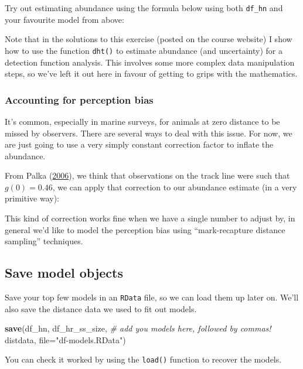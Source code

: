 \documentclass[]{book}
\newenvironment{Shaded}{\begin{snugshade}}{\end{snugshade}}
\newcommand{\KeywordTok}[1]{\textcolor[rgb]{0.13,0.29,0.53}{\textbf{#1}}}
\newcommand{\DataTypeTok}[1]{\textcolor[rgb]{0.13,0.29,0.53}{#1}}
\newcommand{\StringTok}[1]{\textcolor[rgb]{0.31,0.60,0.02}{#1}}
\newcommand{\CommentTok}[1]{\textcolor[rgb]{0.56,0.35,0.01}{\textit{#1}}}
\newcommand{\NormalTok}[1]{#1}
\theoremstyle{definition}
\theoremstyle{definition}
\theoremstyle{remark}
\begin{document}
Try out estimating abundance using the formula below using both
\texttt{df\_hn} and your favourite model from above:

Note that in the solutions to this exercise (posted on the course
website) I show how to use the function \texttt{dht()} to estimate
abundance (and uncertainty) for a detection function analysis. This
involves some more complex data manipulation steps, so we've left it out
here in favour of getting to grips with the mathematics.

\subsubsection{Accounting for perception
bias}\label{accounting-for-perception-bias}

It's common, especially in marine surveys, for animals at zero distance
to be missed by observers. There are several ways to deal with this
issue. For now, we are just going to use a very simply constant
correction factor to inflate the abundance.

From Palka (\protect\hyperlink{ref-Palka2006}{2006}), we think that
observations on the track line were such that \(g(0)=0.46\), we can
apply that correction to our abundance estimate (in a very primitive
way):

This kind of correction works fine when we have a single number to
adjust by, in general we'd like to model the perception bias using
``mark-recapture distance sampling'' techniques.

\subsection{Save model objects}\label{save-model-objects}

Save your top few models in an \texttt{RData} file, so we can load them
up later on. We'll also save the distance data we used to fit out
models.

\begin{Shaded}
\begin{Highlighting}[]
\KeywordTok{save}\NormalTok{(df_hn, df_hr_ss_size, }\CommentTok{# add you models here, followed by commas!}
\NormalTok{     distdata,}
     \DataTypeTok{file=}\StringTok{"df-models.RData"}\NormalTok{)}
\end{Highlighting}
\end{Shaded}

You can check it worked by using the \texttt{load()} function to recover
the models.
\end{document}
